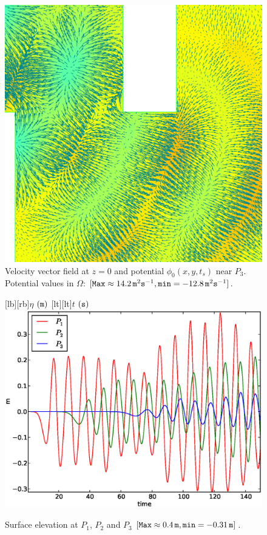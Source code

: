 \begin{figure}[!htb]
{\centering
\includegraphics[width=\largewidth]{chapters/lopes/eps/pvel2.eps}
\caption{Velocity vector field at $z=0$ and potential
\(\phi_0(x,y,t_s)\) near $P_3$.\newline
Potential values in \(\Omega\): \([{\tt Max}\approx 14.2\,{\tt m}^{2}{\tt s}^{-1}, {\tt min}=-12.8\, {\tt m}^{2}{\tt s}^{-1}]\).
}\label{lopes:fig:potential1}\par}
\end{figure}
\begin{figure}[!htb]
{\centering
{}[lb][rb]{$\eta$ $({\tt m})$}
[lt][lt]{$t$ $({\tt s})$}
\includegraphics[width=\largewidth]{chapters/lopes/eps/etaprofile.eps}
\caption{Surface elevation at $P_1$, $P_2$ and $P_3$
\([{\tt Max}\approx 0.4\, {\tt m}, {\tt min}=-0.31\,{\tt m}]\).}\label{lopes:fig:etap}\par}
\end{figure}
